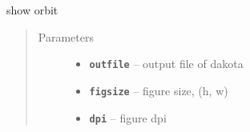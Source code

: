 \documentclass[letterpaper,10pt,english]{sphinxmanual}
\begin{document}
\begin{fulllineitems}
\begin{fulllineitems}
\begin{quote}
\begin{description}
\end{description}\end{quote}

\end{fulllineitems}


\begin{fulllineitems}
\label{src/apidocs/dakopt:genopt.dakopt.DakotaOC.hcors}
\end{fulllineitems}


\begin{fulllineitems}
\label{src/apidocs/dakopt:genopt.dakopt.DakotaOC.latfile}
\end{fulllineitems}


\begin{fulllineitems}
\label{src/apidocs/dakopt:genopt.dakopt.DakotaOC.optdriver}
\end{fulllineitems}


\begin{fulllineitems}
\label{src/apidocs/dakopt:genopt.dakopt.DakotaOC.plot}
show orbit
\begin{quote}\begin{description}
\item[{Parameters}] \leavevmode\begin{itemize}
\item {} 
\textbf{\texttt{outfile}} -- output file of dakota

\item {} 
\textbf{\texttt{figsize}} -- figure size, (h, w)

\item {} 
\textbf{\texttt{dpi}} -- figure dpi

\end{itemize}

\end{description}\end{quote}

\end{fulllineitems}


\end{fulllineitems}
\end{document}
